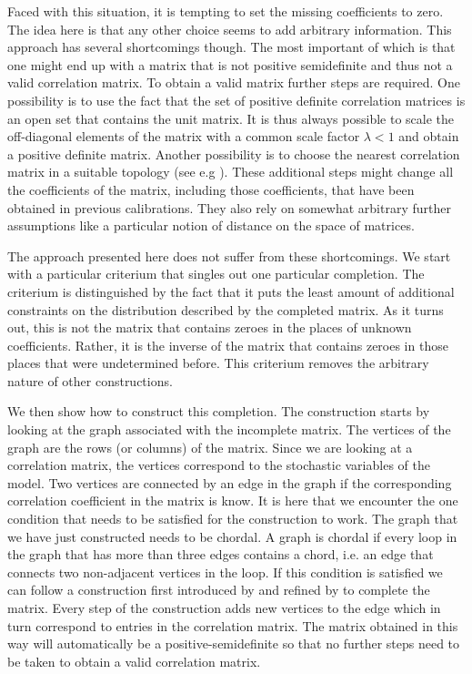 \documentclass[11pt, a4paper]{article}
\begin{document}
Faced with this situation, it is tempting to set the missing coefficients to zero. The idea here is that any other choice seems to add arbitrary information. This approach has several shortcomings though. The most important of which is that one might end up with a matrix that is not positive semidefinite and thus not a valid correlation matrix. To obtain a valid matrix further steps are required. One possibility is to use the fact that the set of positive definite correlation matrices is an open set that contains the unit matrix. It is thus always possible to scale the off-diagonal elements of the matrix with a common scale factor $\lambda<1$ and obtain a positive definite matrix. Another possibility is to choose the nearest correlation matrix in a suitable topology (see e.g \cite{higham}). These additional steps might change all the coefficients of the matrix, including those coefficients, that have been obtained in previous calibrations. They also rely on somewhat arbitrary further assumptions like a particular notion of distance on the space of matrices. 

The approach presented here does not suffer from these shortcomings. We start with a particular criterium that singles out one particular completion. The criterium is distinguished by the fact that it puts the least amount of additional constraints on the distribution described by the completed matrix. As it turns out, this is not the matrix that contains zeroes in the places of unknown coefficients. Rather, it is the inverse of the matrix that contains zeroes in those places that were undetermined before. This criterium removes the arbitrary nature of other constructions. 

We then show how to construct this completion. The construction starts by looking at the graph associated with the incomplete matrix. The vertices of the graph are the rows (or columns) of the matrix. Since we are looking at a correlation matrix, the vertices correspond to the stochastic variables of the model. Two vertices are connected by an edge in the graph if the corresponding correlation coefficient in the matrix is know. It is here that we encounter the one condition that needs to be satisfied for the construction to work. The graph that we have just constructed needs to be chordal. A graph is chordal if every loop in the graph that has more than three edges contains a chord, i.e. an edge that connects two non-adjacent vertices in the loop. If this condition is satisfied we can follow a construction first introduced by \cite{grone} and refined by \cite{smith} to complete the matrix. Every step of the construction adds new vertices to the edge which in turn correspond to entries in the correlation matrix. The matrix obtained in this way will automatically be a positive-semidefinite so that no further steps need to be taken to obtain a valid correlation matrix. 
\end{document}
